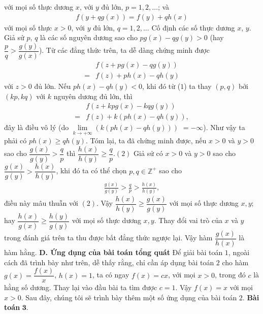\begin{multicols}{2}
			với mọi số thực dương $ x $, với  $ y$ đủ lớn, $p = 1,2, \ldots $; và
			\begin{align*}
				f(y + qg(x)) = f(y) + qh(x)
			\end{align*}
			với mọi số thực $x>0 $, với  $y$ đủ lớn, $ q = 1,2, \ldots $
			\vskip 0.1cm
			Cố định các số thực dương $x$, $y$.
			Giả sử $p$, $q$ là các số nguyên dương  sao cho $p g(x)-q g(y)>0$ (hay $\dfrac{p}{q} > \dfrac{{g(y)}}{{g(x)}}$). Từ các đẳng thức trên, ta dễ dàng chứng minh được
			\begin{align*}
				&f(z+p g(x)-q g(y))\\
				=&f(z)+p h(x)-q h(y)\tag{$1$}
			\end{align*}
			với $z>0$ đủ lớn. Nếu $p h(x)-q h(y)<0$, khi đó từ ($1$) ta thay $(p, q)$ bởi $(k p, k q)$ với $k$ nguyên dương đủ lớn, thì
			\begin{align*}
				&f(z + kpg(x) - kqg(y)) \\
				= &f(z) + k\left( {ph(x) - qh(y)} \right),
			\end{align*}
			đây là điều vô lý (do $\mathop {\lim }\limits_{k \to  + \infty }\!\! \left( k\left( {ph(x) \!-\! qh(y)} \right)\right)$ \linebreak$=  - \infty $). 
			Như vậy ta phải có $p h(x)\ge q h(y) $.
			Tóm lại, ta đã chứng minh được, nếu $x>0$ và $y>0$ sao cho 
			$\dfrac{g(x)}{g(y)}>\dfrac{q}{p}$ thì
			$\dfrac{h(x)}{h(y)} \geq \dfrac{q}{p}$.\hfill$(2)$
			\vskip 0.1cm
			Giả sử có $x>0$ và $y>0$ sao cho  $\dfrac{g(x)}{g(y)}>\dfrac{h(x)}{h(y)}$, khi đó ta có thể chọn $p, q \in \mathbb{Z}^{+}$ sao cho
			\begin{align*}
				\frac{g(x)}{g(y)}>\frac{q}{p}>\frac{h(x)}{h(y)},
			\end{align*}
			điều này mâu thuẫn với $(2)$. Vậy $\dfrac{h(x)}{h(y)} \geq \dfrac{g(x)}{g(y)}$ với mọi số thực dương $ x, y$;  hay
			$
			\dfrac{h(x)}{g(x)} \geq \dfrac{h(y)}{g(y)}$ với mọi số thực dương $ x, y$.
			Thay đổi vai trò của $x$ và $y$ trong đánh giá trên ta thu được bất đẳng thức ngược lại.
			Vậy hàm $\dfrac{g(x)}{h(x)}$ là hàm hằng.
	\vskip 0.1cm
	\textbf{\color{hoccungpi}D. Ứng dụng của bài toán tổng quát}
	\vskip 0.1cm
	Để giải bài toán $1$, ngoài cách đã trình bày như trên, dễ thấy rằng, chỉ cần áp dụng  bài toán $2$ cho hàm 
	$g(x)=\dfrac{f(x)}{x}$, $h(x)=1$,
	ta có ngay $f(x)=c x$, với mọi $x>0$, trong đó $c$ là hằng số dương. Thay lại vào đầu bài ta tìm được $c=1$.
	Vậy $f(x)=x$ với mọi $ x>0$.
	Sau đây, chúng tôi sẽ trình bày thêm một số ứng dụng của bài toán $2$.
	\vskip 0.1cm
	\textbf{\color{hoccungpi}Bài toán} $\pmb{3.}$

\end{multicols}
